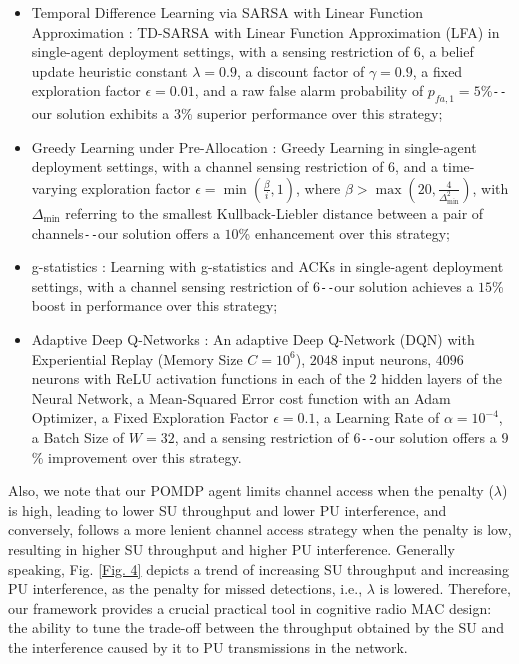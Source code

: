 \documentclass[12pt, draftcls, onecolumn]{IEEEtran}
\begin{document}
\begin{itemize}
    \item Temporal Difference Learning via SARSA with Linear Function Approximation \cite{WCL:5}: TD-SARSA with Linear Function Approximation (LFA) in single-agent deployment settings, with a sensing restriction of $6$, a belief update heuristic constant $\lambda{=}0.9$, a discount factor of $\gamma{=}0.9$, a fixed exploration factor $\epsilon{=}0.01$, and a raw false alarm probability of $p_{fa,1}{=}5$\%\texttt{-{}-}our solution exhibits a $3$\% superior performance over this strategy;
    \item Greedy Learning under Pre-Allocation \cite{WCL:MIT}: Greedy Learning in single-agent deployment settings, with a channel sensing restriction of $6$, and a time-varying exploration factor $\epsilon{=}\min(\frac{\beta}{i}, 1)$, where $\beta{>}\max(20, \frac{4}{\Delta_{\text{min}}^{2}})$, with $\Delta_{\text{min}}$ referring to the smallest Kullback-Liebler distance between a pair of channels\texttt{-{}-}our solution offers a $10$\% enhancement over this strategy;
    \item g-statistics \cite{WCL:MIT}: Learning with g-statistics and ACKs in single-agent deployment settings, with a channel sensing restriction of $6$\texttt{-{}-}our solution achieves a $15$\% boost in performance over this strategy;
    \item Adaptive Deep Q-Networks \cite{WCL:DQN}: An adaptive Deep Q-Network (DQN) with Experiential Replay (Memory Size $C{=}10^{6}$), $2048$ input neurons, $4096$ neurons with ReLU activation functions in each of the $2$ hidden layers of the Neural Network, a Mean-Squared Error cost function with an Adam Optimizer, a Fixed Exploration Factor $\epsilon{=}0.1$, a Learning Rate of $\alpha{=}10^{-4}$, a Batch Size of $W{=}32$, and a sensing restriction of $6$\texttt{-{}-}our solution offers a $9$\% improvement over this strategy.
\end{itemize}
Also, we note that our POMDP agent limits channel access when the penalty ($\lambda$) is high, leading to lower SU throughput and lower PU interference, and conversely, follows a more lenient channel access strategy when the penalty is low, resulting in higher SU throughput and higher PU interference. Generally speaking, Fig. \ref{Fig. 4} depicts a trend of increasing SU throughput and increasing PU interference, as the penalty for missed detections, i.e., $\lambda$ is lowered. Therefore, our framework provides a crucial practical tool in cognitive radio MAC design: the ability to tune the trade-off between the throughput obtained by the SU and the interference caused by it to PU transmissions in the network.
\end{document}
